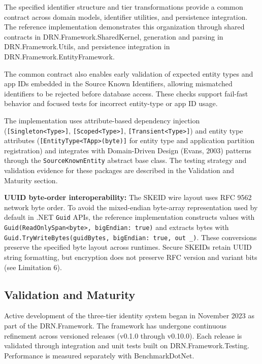 \documentclass[fleqn,10pt,lineno]{wlpeerj}
\begin{document}
The specified identifier structure and tier transformations provide a
common contract across domain models, identifier utilities, and
persistence integration. The reference implementation demonstrates this
organization through shared contracts in DRN.Framework.SharedKernel,
generation and parsing in DRN.Framework.Utils, and persistence
integration in DRN.Framework.EntityFramework.

The common contract also enables early validation of expected entity
types and app IDs embedded in the Source Known Identifiers, allowing
mismatched identifiers to be rejected before database access. These
checks support fail-fast behavior and focused tests for incorrect
entity-type or app ID usage.

The implementation uses attribute-based dependency injection
(\texttt{{[}Singleton\textless{}Type\textgreater{}{]}},
\texttt{{[}Scoped\textless{}Type\textgreater{}{]}},
\texttt{{[}Transient\textless{}Type\textgreater{}{]}}) and entity type
attributes (\texttt{{[}EntityType\textless{}TApp\textgreater{}(byte){]}}
for entity type and application partition registration) and integrates
with Domain-Driven Design (Evans, 2003) patterns through the
\texttt{SourceKnownEntity} abstract base class. The testing strategy and
validation evidence for these packages are described in the Validation
and Maturity section.

\textbf{UUID byte-order interoperability:} The SKEID wire layout uses
RFC 9562 network byte order. To avoid the mixed-endian byte-array
representation used by default in .NET \texttt{Guid} APIs, the reference
implementation constructs values with
\texttt{Guid(ReadOnlySpan\textless{}byte\textgreater{},\ bigEndian:\ true)}
and extracts bytes with
\texttt{Guid.TryWriteBytes(guidBytes,\ bigEndian:\ true,\ out\ \_)}.
These conversions preserve the specified byte layout across runtimes.
Secure SKEIDs retain UUID string formatting, but encryption does not
preserve RFC version and variant bits (see Limitation 6).

\subsection{Validation and Maturity}\label{validation-and-maturity}

Active development of the three-tier identity system began in November
2023 as part of the DRN.Framework. The framework has undergone
continuous refinement across versioned releases (v0.1.0 through
v0.10.0). Each release is validated through integration and unit tests
built on DRN.Framework.Testing. Performance is measured separately with
BenchmarkDotNet.
\end{document}
